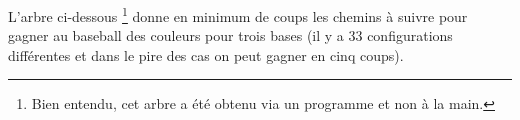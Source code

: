 L'arbre ci-dessous
\footnote{
	Bien entendu, cet arbre a été obtenu via un programme et non à la main.
}
donne en minimum de coups les chemins à suivre pour gagner au baseball des couleurs pour trois bases (il y a 33 configurations différentes et dans le pire des cas on peut gagner en cinq coups).


